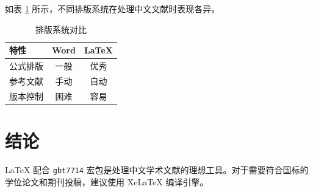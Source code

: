 \documentclass[12pt,a4paper,fontset=fandol]{ctexart}
\begin{document}
如表 \ref{tab:compare} 所示，不同排版系统在处理中文文献时表现各异\cite{吴九2022知识图谱, johnson2019attention}。

\begin{table}[htbp]
\centering
\caption{排版系统对比}
\label{tab:compare}
\begin{tabular}{lcc}
\hline
\textbf{特性} & \textbf{Word} & \textbf{LaTeX} \\
\hline
公式排版 & 一般 & 优秀 \\
参考文献 & 手动 & 自动 \\
版本控制 & 困难 & 容易 \\
\hline
\end{tabular}
\end{table}

\section{结论}

LaTeX 配合 \texttt{gbt7714} 宏包是处理中文学术文献的理想工具\cite{刘十一2019博士论文, 孙十二2020硕士论文}。对于需要符合国标的学位论文和期刊投稿，建议使用 XeLaTeX 编译引擎\cite{钱十三2021技术报告}。

\nocite{*}


\end{document}
